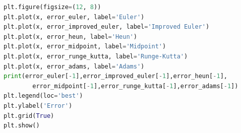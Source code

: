 \documentclass[a4paper,11pt,notitlepage]{article}
\begin{document}
\begin{lstlisting}[language=Python,caption={Tenth Chapter.py},label={code1}]
plt.figure(figsize=(12, 8))
plt.plot(x, error_euler, label='Euler')
plt.plot(x, error_improved_euler, label='Improved Euler')
plt.plot(x, error_heun, label='Heun')
plt.plot(x, error_midpoint, label='Midpoint')
plt.plot(x, error_runge_kutta, label='Runge-Kutta')
plt.plot(x, error_adams, label='Adams')
print(error_euler[-1],error_improved_euler[-1],error_heun[-1],
        error_midpoint[-1],error_runge_kutta[-1],error_adams[-1])
plt.legend(loc='best')
plt.ylabel('Error')
plt.grid(True)
plt.show()       
\end{lstlisting}
\end{document}
